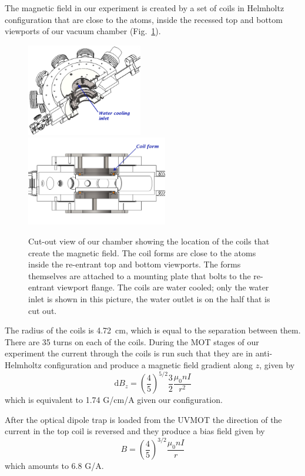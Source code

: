 \documentclass[oneside,12pt]{memoir}
\begin{document}
The magnetic field in our experiment is created by a set of coils in
Helmholtz configuration that are close to the atoms, inside the recessed top
and bottom viewports of our vacuum chamber (Fig.~\ref{fig:coilforms}).
\begin{figure} 
\includegraphics[width=0.45\textwidth]{../figures/coils/angleview.pdf}
\includegraphics[width=0.55\textwidth]{../figures/coils/sideview.pdf}
\caption[Location of magnetic field coil forms ]{\small Cut-out view of our
chamber showing the location of the coils that create the magnetic field.   The
coil forms are close to the atoms inside the re-entrant top and bottom viewports.
The forms themselves are attached to a mounting plate that bolts to the
re-entrant viewport flange.  The coils are water cooled; only  the water inlet
is shown in this picture, the water outlet is on the half that is cut out. }
\label{fig:coilforms} \end{figure} The radius of the coils is 4.72~cm,
which is equal to the separation between them.  There are 35 turns on each of
the coils.  During the MOT stages of our experiment the current through the
coils is run such that they are in anti-Helmholtz configuration and produce a
magnetic field gradient along $z$, given by \[ \mathrm{d}B_{z} = \left(
\frac{4}{5} \right) ^{5/2} \frac{3}{2} \frac{\mu_{0} n I } { r^{2} } \] which
is equivalent to 1.74 G/cm/A given our configuration. 

After the optical dipole trap is loaded from the UVMOT the direction of the
current in the top coil is reversed and they produce a bias field given by \[ B
= \left( \frac{4}{5} \right) ^{3/2} \frac{\mu_{0} n I }{r}  \] which amounts to
6.8 G/A.   
\end{document}
